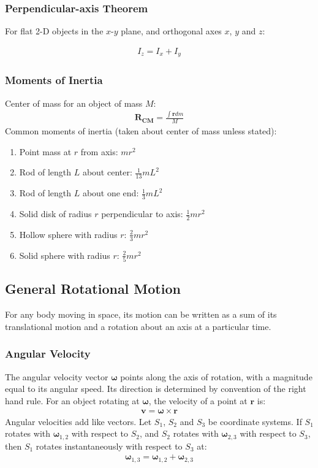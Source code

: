 \documentclass[11pt]{article}
\newcommand{\ve}[1]{
  \ensuremath{\bm{#1}}}	               %
\begin{document}
\begin{multicols*}{3}
\subsubsection{Perpendicular-axis Theorem}
For flat 2-D objects in the $x$-$y$ plane, and orthogonal axes $x$, $y$ and $z$:

\begin{align*}
I_z=I_x+I_y
\end{align*}
\subsubsection{Moments of Inertia}
Center of mass for an object of mass $M$:
\begin{align*}
\ve{R_\text{CM}}=\frac{\int\ve{r}dm}{M}
\end{align*}
Common moments of inertia (taken about center of mass unless stated):
\begin{enumerate}
\setlength{\itemsep}{2mm}
\item Point mass at $r$ from axis: $mr^2$
\item Rod of length $L$ about center: $\frac{1}{13}mL^2$
\item Rod of length $L$ about one end: $\frac{1}{3}mL^2$
\item Solid disk of radius $r$ perpendicular to axis: $\frac{1}{2}mr^2$
\item Hollow sphere with radius $r$: $\frac{2}{3}mr^2$
\item Solid sphere with radius $r$: $\frac{2}{5}mr^2$
\end{enumerate}

\subsection{General Rotational Motion}
For any body moving in space, its motion can be written as a sum of its translational motion and a rotation about an axis at a particular time. 

\subsubsection{Angular Velocity}
The angular velocity vector $\ve{\omega}$ points along the axis of rotation, with a  magnitude equal to its angular speed. Its direction is determined by convention of the right hand rule. For an object rotating at $\ve{\omega}$, the velocity of a point at $\ve{r}$ is:
\begin{align*}
\ve{v} = \ve{\omega} \times \ve{r}
\end{align*}
Angular velocities add like vectors. Let $S_1$, $S_2$ and $S_3$ be coordinate systems. If $S_1$ rotates with $\ve{\omega}_{1, 2}$ with respect to $S_2$, and $S_2$ rotates with $\ve{\omega}_{2, 3}$ with respect to $S_3$, then $S_1$ rotates instantaneously with respect to $S_3$ at: 
\begin{align*}
\ve{\omega}_{1, 3} = \ve{\omega}_{1, 2} + \ve{\omega}_{2, 3}
\end{align*}


\end{multicols*}
\end{document}
